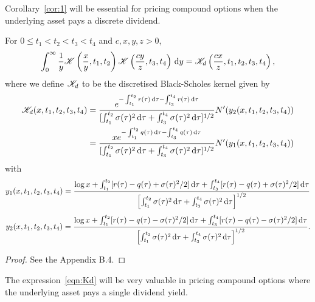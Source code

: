 Corollary~\ref{cor:1} will be essential for pricing compound options when the underlying asset pays a discrete dividend.
	\begin{lemma}
		\label{lem:kd}
		For $0 \leq t_1 < t_2 < t_3 < t_4$ and $c,x,y,z > 0$,
		\begin{equation}
			\label{eqn:intlem1}
			\int_0^\infty \frac{1}{y}\mathscr K\left( \frac{x}{y}, t_1, t_2 \right)\mathscr K\left( \frac{cy}{z}, t_3, t_4 \right) \, \mathrm d y = \mathscr K_d\left( \frac{cx}{z}, t_1, t_2, t_3, t_4 \right),
		\end{equation}
where we define $\mathscr K_d$ to be the discretised Black-Scholes kernel given by
	\begin{equation}
		\label{eqn:Kd}
		\begin{split}
		\mathscr K_d(x,t_1,t_2,t_3,t_4) &=  \frac{e^{-\int_{t_1}^{t_2} r(\tau) \, \mathrm d\tau - \int_{t_3}^{t_4} r(\tau) \, \mathrm d\tau}}{[\int_{t_1}^{t_2} \sigma(\tau)^2 \, \mathrm d\tau + \int_{t_3}^{t_4} \sigma(\tau)^2 \, \mathrm d\tau]^{1/2}}N'(y_2(x,t_1,t_2,t_3,t_4))
\\
		& =  \frac{xe^{-\int_{t_1}^{t_2} q(\tau) \, \mathrm d\tau - \int_{t_3}^{t_4} q(\tau) \, \mathrm d\tau}}{[\int_{t_1}^{t_2} \sigma(\tau)^2 \, \mathrm d\tau + \int_{t_3}^{t_4} \sigma(\tau)^2 \, \mathrm d\tau]^{1/2}}N'(y_1(x,t_1,t_2,t_3,t_4))
		\end{split}
	\end{equation}
with
	\begin{equation}
		\label{eqn:y1}
		y_1(x,t_1,t_2,t_3,t_4) = \frac{\log x + \int_{t_1}^{t_2} [r(\tau) - q(\tau) + \sigma(\tau)^2/2] \, \mathrm d\tau + \int_{t_3}^{t_4} [r(\tau) - q(\tau) + \sigma(\tau)^2/2] \, \mathrm d\tau}{\left[\int_{t_1}^{t_2} \sigma(\tau)^2 \, \mathrm d\tau + \int_{t_3}^{t_4} \sigma(\tau)^2 \, \mathrm d\tau\right]^{1/2}}
	\end{equation}
	\begin{equation}
		\label{eqn:y2}
		y_2(x,t_1,t_2,t_3,t_4) = \frac{\log x + \int_{t_1}^{t_2} [r(\tau) - q(\tau) - \sigma(\tau)^2/2] \, \mathrm d\tau + \int_{t_3}^{t_4} [r(\tau) - q(\tau) - \sigma(\tau)^2/2] \, \mathrm d\tau}{\left[\int_{t_1}^{t_2} \sigma(\tau)^2 \, \mathrm d\tau + \int_{t_3}^{t_4} \sigma(\tau)^2 \, \mathrm d\tau\right]^{1/2}}.
	\end{equation}
	\end{lemma}
\begin{proof}
	See the Appendix B.4.
\end{proof}
The expression~\eqref{eqn:Kd} will be very valuable in pricing compound options where the underlying asset pays a single dividend yield.
